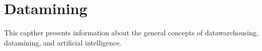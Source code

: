 \section{Datamining}
This capther presents information about the general concepts of datawarehousing, datamining, and artificial intelligence. 